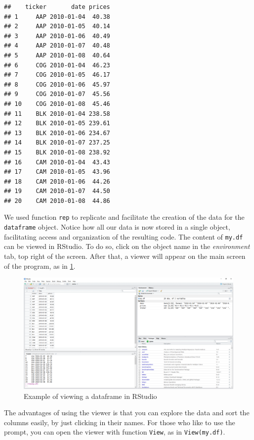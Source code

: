 \documentclass[11pt,]{book}
\begin{document}
\begin{verbatim}
##    ticker       date prices
## 1     AAP 2010-01-04  40.38
## 2     AAP 2010-01-05  40.14
## 3     AAP 2010-01-06  40.49
## 4     AAP 2010-01-07  40.48
## 5     AAP 2010-01-08  40.64
## 6     COG 2010-01-04  46.23
## 7     COG 2010-01-05  46.17
## 8     COG 2010-01-06  45.97
## 9     COG 2010-01-07  45.56
## 10    COG 2010-01-08  45.46
## 11    BLK 2010-01-04 238.58
## 12    BLK 2010-01-05 239.61
## 13    BLK 2010-01-06 234.67
## 14    BLK 2010-01-07 237.25
## 15    BLK 2010-01-08 238.92
## 16    CAM 2010-01-04  43.43
## 17    CAM 2010-01-05  43.96
## 18    CAM 2010-01-06  44.26
## 19    CAM 2010-01-07  44.50
## 20    CAM 2010-01-08  44.86
\end{verbatim}

We used function \texttt{rep} to replicate and facilitate the creation
of the data for the \texttt{dataframe} object. Notice how all our data
is now stored in a single object, facilitating access and organization
of the resulting code. The content of \texttt{my.df} can be viewed in
RStudio. To do so, click on the object name in the \emph{environment}
tab, top right of the screen. After that, a viewer will appear on the
main screen of the program, as in \ref{fig:example-view}.

\begin{figure}[!htbp]

{\centering \includegraphics[width=1\linewidth]{figs/Command_view} 

}

\caption{Example of viewing a dataframe in RStudio}\label{fig:example-view}
\end{figure}

The advantages of using the viewer is that you can explore the data and
sort the columns easily, by just clicking in their names. For those who
like to use the prompt, you can open the viewer with function
\texttt{View}, as in \texttt{View(my.df)}. 
\end{document}
